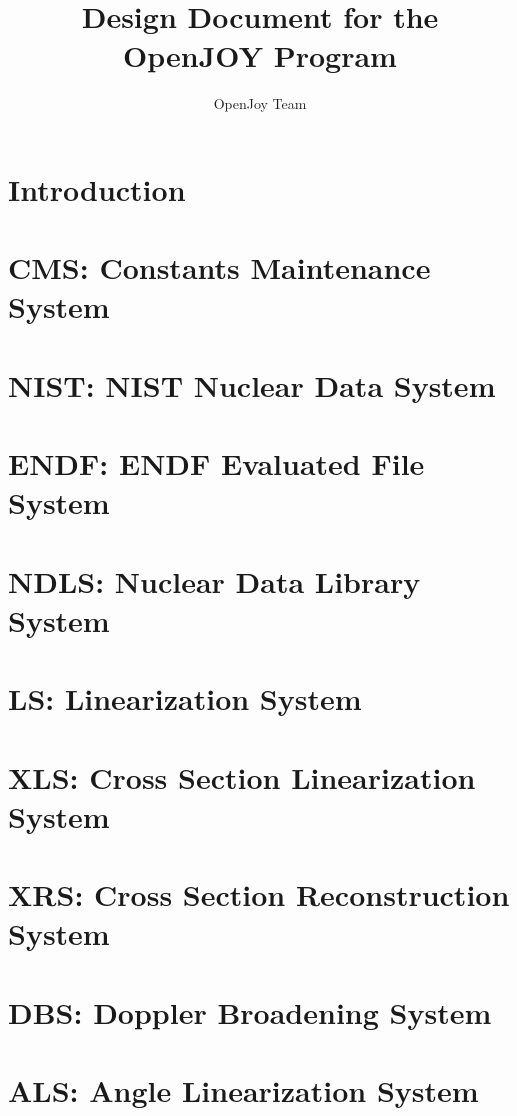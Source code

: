 \documentclass[thesis]{./tex/thesis-umich}
\title{Design Document for the OpenJOY Program}
\author{OpenJoy Team}
\begin{document}
\chapter{Introduction}   \label{chap:intro}

\chapter{CMS: Constants Maintenance System} \label{chap:cms}


\chapter{NIST: NIST Nuclear Data System} \label{chap:nist}


\chapter{ENDF: ENDF Evaluated File System} \label{chap:endf}


\chapter{NDLS: Nuclear Data Library System} \label{chap:ndls}


\chapter{LS: Linearization System} \label{chap:ls}


\chapter{XLS: Cross Section Linearization System} \label{chap:xls}


\chapter{XRS: Cross Section Reconstruction System} \label{chap:xrs}


\chapter{DBS: Doppler Broadening System} \label{chap:dbs}


\chapter{ALS: Angle Linearization System} \label{chap:als}

\end{document}
